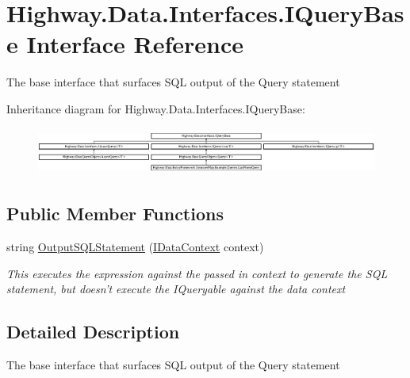 \hypertarget{interface_highway_1_1_data_1_1_interfaces_1_1_i_query_base}{\section{Highway.\-Data.\-Interfaces.\-I\-Query\-Base Interface Reference}
\label{interface_highway_1_1_data_1_1_interfaces_1_1_i_query_base}
}


The base interface that surfaces S\-Q\-L output of the Query statement  


Inheritance diagram for Highway.\-Data.\-Interfaces.\-I\-Query\-Base\-:\begin{figure}[H]
\begin{center}
\leavevmode
\includegraphics[height=1.578577cm]{interface_highway_1_1_data_1_1_interfaces_1_1_i_query_base}
\end{center}
\end{figure}
\subsection*{Public Member Functions}
\begin{DoxyCompactItemize}
\item 
string \hyperlink{interface_highway_1_1_data_1_1_interfaces_1_1_i_query_base_a151df3073faaf51d98207e2794f62817}{Output\-S\-Q\-L\-Statement} (\hyperlink{interface_highway_1_1_data_1_1_interfaces_1_1_i_data_context}{I\-Data\-Context} context)
\begin{DoxyCompactList}\small\item\em This executes the expression against the passed in context to generate the S\-Q\-L statement, but doesn't execute the I\-Queryable against the data context \end{DoxyCompactList}\end{DoxyCompactItemize}


\subsection{Detailed Description}
The base interface that surfaces S\-Q\-L output of the Query statement 



